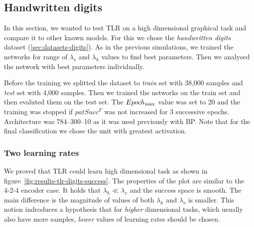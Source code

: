

\subsection{Handwritten digits} 
\label{sec:results-digits} 

In this section, we wanted to test TLR on a high dimensional graphical task and compare it to other known models. For this we chose the \emph{handwritten digits} dataset (\ref{sec:datasets-digits}). As in the previous simulations, we trained the networks for range of $\lambda_v$ and $\lambda_h$ values to find best parameters. Then we analysed the network with best parameters individually. 

Before the training we splitted the dataset to \emph{train} set with 38,000 samples and \emph{test} set with 4,000 samples. Then we trained the networks on the train set and then evaluted them on the test set. The $Epoch_{\rm max}$ value was set to 20 and the training was stopped if $patSucc^F$ was not increased for 3 successive epochs. Architecture was 784--300--10 as it was used previously with BP. Note that for the final classification we chose the unit with greatest activation. 

\subsubsection{Two learning rates} 
\label{sec:tlr-digits} 

We proved that TLR could learn high dimensional task as shown in figure~\ref{fig:results-tlr-digits-success}. The properties of the plot are similar to the 4-2-4 encoder case. It holds that $\lambda_h \ll \lambda_v$ and the success space is smooth. The main difference is the magnitude of values of both $\lambda_h$ and $\lambda_v$ is smaller. This notion indroduces a hypothesis that for \emph{higher} dimensional tasks, which usually also have more samples, \emph{lower} values of learning rates should be chosen. 


